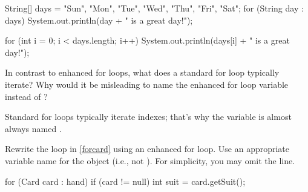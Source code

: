 \vspace{1ex}
\begin{javalst}
String[] days = {"Sun", "Mon", "Tue", "Wed", "Thu", "Fri", "Sat"};
for (String day : days) {
    System.out.println(day + " is a great day!");
}
\end{javalst}
\vspace{-1em}

\begin{answer}[5em]
\begin{javaans}
for (int i = 0; i < days.length; i++) {
    System.out.println(days[i] + " is a great day!");
}
\end{javaans}
\end{answer}


\Q In contrast to enhanced for loops, what does a standard for loop typically iterate?
Why would it be misleading to name the enhanced for loop variable  instead of ?

\begin{answer}[3em]
Standard for loops typically iterate indexes; that's why the variable is almost always named .
\end{answer}


\Q Rewrite the loop in \ref{forcard} using an enhanced for loop.
Use an appropriate variable name for the  object (i.e., not ).
For simplicity, you may omit the  line.

\vspace{-1ex}
\begin{answer}[7em]
\begin{javaans}
for (Card card : hand) {
    if (card != null) {
        int suit = card.getSuit();
    }
}
\end{javaans}
\end{answer}
